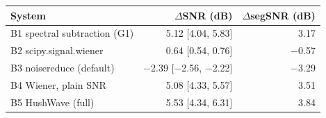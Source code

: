 \begin{tabular}{lrr}
\toprule
System & $\Delta$SNR (dB) & $\Delta$segSNR (dB) \\
\midrule
B1 spectral subtraction (G1) & 5.12 [4.04, 5.83] & 3.17 \\
B2 scipy.signal.wiener & 0.64 [0.54, 0.76] & $-$0.57 \\
B3 noisereduce (default) & $-$2.39 [$-$2.56, $-$2.22] & $-$3.29 \\
B4 Wiener, plain SNR & 5.08 [4.33, 5.57] & 3.51 \\
B5 HushWave (full) & 5.53 [4.34, 6.31] & 3.84 \\
\bottomrule
\end{tabular}
